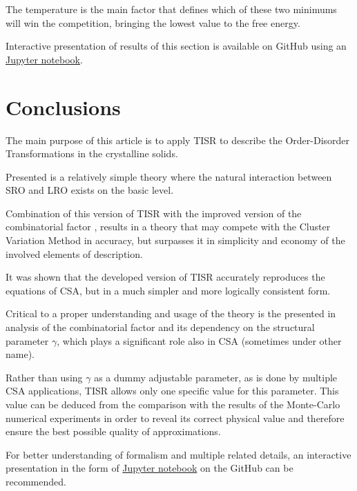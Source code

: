 \documentclass[12pt,abstract]{scrartcl}
\begin{document}
The temperature is the main factor that defines which of these two minimums will win the competition, bringing the lowest value to the free energy.

Interactive presentation of results of this section is available on GitHub using an 
\href{https://github.com/EdKr2/TISR6/blob/master/notebooks/ordering_Cu3Au.ipynb}{Jupyter notebook}.


\section{Conclusions}

The main purpose of this article is to apply TISR  to describe the Order-Disorder Transformations in the crystalline solids.

Presented is a relatively simple theory where the natural interaction between SRO and LRO exists on the basic level.

Combination of  this version of TISR with the improved version of the combinatorial factor  \cite{TISR_p4}, results in a theory that may compete with the Cluster Variation Method  \cite{moran2012} in accuracy, but surpasses  it in simplicity and economy of the involved elements of description.

It was shown that the developed version of TISR accurately reproduces the equations of CSA, but in a much simpler and more logically consistent form.


Critical to a proper understanding and usage of the theory is the presented in \cite{TISR_p4} analysis of the combinatorial factor and its dependency on the structural parameter $\gamma$, which plays a significant role also in CSA (sometimes under other name).

Rather than using $\gamma$ as a dummy adjustable parameter, as is done by multiple CSA  applications, TISR allows only one specific value for this parameter.
This value can be deduced from the comparison with the results of the Monte-Carlo numerical experiments in
order to reveal its correct physical value and therefore ensure the best possible quality of approximations.


For better understanding of  formalism and multiple related details, an interactive presentation in the form of
\href{https://github.com/EdKr2/TISR6/blob/master/notebooks/ordering_Cu3Au.ipynb}{Jupyter notebook} on the GitHub can be recommended.



\end{document}
